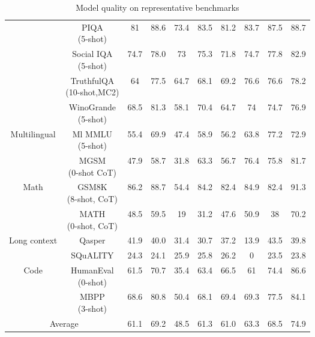\begin{table}[t]
\begin{center}
\begin{adjustbox}{width=1.0\textwidth,center}
\begin{tabular}{ c|c||cccccccc }
 & \makecell{ PIQA \\ \footnotesize (5-shot) } & 81 & 88.6 & 73.4 & 83.5 & 81.2 & 83.7 & 87.5 & 88.7 \\ %
 & \makecell{ Social IQA \\ \footnotesize (5-shot) } & 74.7 & 78.0 & 73 & 75.3 & 71.8 & 74.7 & 77.8 & 82.9 \\ %
 & \makecell{ TruthfulQA \\ \footnotesize (10-shot,MC2) } & 64 & 77.5 & 64.7 & 68.1 & 69.2 & 76.6 & 76.6 & 78.2 \\ %
 & \makecell{ WinoGrande \\ \footnotesize (5-shot) } & 68.5 & 81.3 & 58.1 & 70.4 & 64.7 & 74 & 74.7 & 76.9 \\ \hline
\multirow{2}{*}{Multilingual} & \makecell{ Ml MMLU \\ \footnotesize (5-shot) } & 55.4 & 69.9 & 47.4 & 58.9 & 56.2 & 63.8 & 77.2 & 72.9 \\ %
 & \makecell{ MGSM \\ \footnotesize (0-shot CoT) } & 47.9 & 58.7 & 31.8 & 63.3 & 56.7 & 76.4 & 75.8 & 81.7 \\ \hline
\multirow{2}{*}{Math} & \makecell{ GSM8K \\ \footnotesize (8-shot, CoT) } & 86.2 & 88.7 & 54.4 & 84.2 & 82.4 & 84.9 & 82.4 & 91.3 \\ %
 & \makecell{ MATH \\ \footnotesize (0-shot, CoT) } & 48.5 & 59.5 & 19 & 31.2 & 47.6 & 50.9 & 38 & 70.2 \\ \hline
\multirow{2}{*}{Long context} & Qasper & 41.9 & 40.0 & 31.4 & 30.7 & 37.2 & 13.9 & 43.5 & 39.8 \\ %
 & SQuALITY & 24.3 & 24.1 & 25.9 & 25.8 & 26.2 & 0 & 23.5 & 23.8 \\ \hline
\multirow{2}{*}{Code} & \makecell{ HumanEval \\ \footnotesize (0-shot)} & 61.5 & 70.7 & 35.4 & 63.4 & 66.5 & 61 & 74.4 & 86.6 \\ %
 & \makecell{ MBPP \\ \footnotesize (3-shot) }& 68.6 & 80.8 & 50.4 & 68.1 & 69.4 & 69.3 & 77.5 & 84.1 \\ \hline
\multicolumn{2}{c}{Average} & 61.1 & {69.2} & {48.5} & {61.3} & {61.0} & {63.3} & {68.5} & {74.9} \\ %
\end{tabular}
\end{adjustbox}
\caption{Model quality on representative benchmarks}
\label{tab:benchmark-comparison-3.5}
\end{center}
\end{table}

